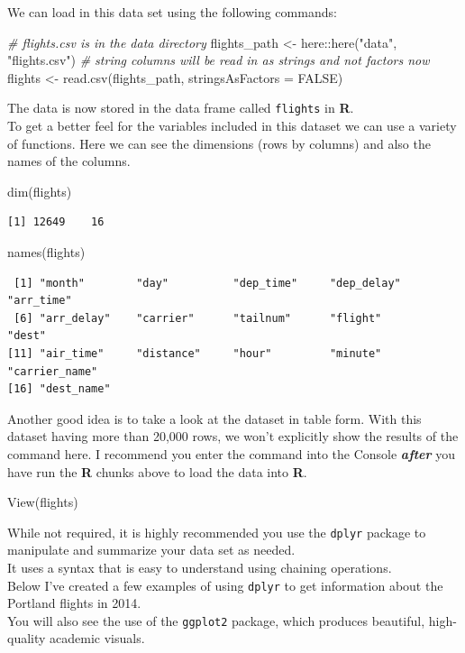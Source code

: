 \documentclass[12pt,oneside]{tisemthesis}
\newenvironment{Shaded}{\begin{snugshade}}{\end{snugshade}}
\newcommand{\AttributeTok}[1]{\textcolor[rgb]{0.77,0.63,0.00}{#1}}
\newcommand{\CommentTok}[1]{\textcolor[rgb]{0.56,0.35,0.01}{\textit{#1}}}
\newcommand{\ConstantTok}[1]{\textcolor[rgb]{0.00,0.00,0.00}{#1}}
\newcommand{\FunctionTok}[1]{\textcolor[rgb]{0.00,0.00,0.00}{#1}}
\newcommand{\NormalTok}[1]{#1}
\newcommand{\OtherTok}[1]{\textcolor[rgb]{0.56,0.35,0.01}{#1}}
\newcommand{\SpecialCharTok}[1]{\textcolor[rgb]{0.00,0.00,0.00}{#1}}
\newcommand{\StringTok}[1]{\textcolor[rgb]{0.31,0.60,0.02}{#1}}
\begin{document}
We can load in this data set using the following commands:
\begin{Shaded}
\begin{Highlighting}[]
\CommentTok{\# flights.csv is in the data directory}
\NormalTok{flights\_path }\OtherTok{\textless{}{-}}\NormalTok{ here}\SpecialCharTok{::}\FunctionTok{here}\NormalTok{(}\StringTok{"data"}\NormalTok{, }\StringTok{"flights.csv"}\NormalTok{)}
\CommentTok{\# string columns will be read in as strings and not factors now}
\NormalTok{flights }\OtherTok{\textless{}{-}} \FunctionTok{read.csv}\NormalTok{(flights\_path, }\AttributeTok{stringsAsFactors =} \ConstantTok{FALSE}\NormalTok{)}
\end{Highlighting}
\end{Shaded}
The data is now stored in the data frame called \texttt{flights} in \textbf{R}.\\
To get a better feel for the variables included in this dataset we can use a variety of functions.
Here we can see the dimensions (rows by columns) and also the names of the columns.
\begin{Shaded}
\begin{Highlighting}[]
\FunctionTok{dim}\NormalTok{(flights)}
\end{Highlighting}
\end{Shaded}
\begin{verbatim}
[1] 12649    16
\end{verbatim}
\begin{Shaded}
\begin{Highlighting}[]
\FunctionTok{names}\NormalTok{(flights)}
\end{Highlighting}
\end{Shaded}
\begin{verbatim}
 [1] "month"        "day"          "dep_time"     "dep_delay"    "arr_time"    
 [6] "arr_delay"    "carrier"      "tailnum"      "flight"       "dest"        
[11] "air_time"     "distance"     "hour"         "minute"       "carrier_name"
[16] "dest_name"   
\end{verbatim}
Another good idea is to take a look at the dataset in table form. With this dataset having more than 20,000 rows, we won't explicitly show the results of the command here.
I recommend you enter the command into the Console \textbf{\emph{after}} you have run the \textbf{R} chunks above to load the data into \textbf{R}.
\begin{Shaded}
\begin{Highlighting}[]
\FunctionTok{View}\NormalTok{(flights)}
\end{Highlighting}
\end{Shaded}
While not required, it is highly recommended you use the \texttt{dplyr} package to manipulate and summarize your data set as needed.\\
It uses a syntax that is easy to understand using chaining operations.\\
Below I've created a few examples of using \texttt{dplyr} to get information about the Portland flights in 2014.\\
You will also see the use of the \texttt{ggplot2} package, which produces beautiful, high-quality academic visuals.
\end{document}
